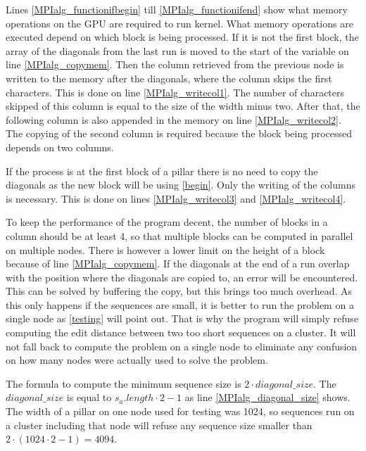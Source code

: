 Lines \ref{MPIalg_functionifbegin} till \ref{MPIalg_functionifend} show what memory operations on the GPU are required to run kernel.
What memory operations are executed depend on which block is being processed.
If it is not the first block, the array of the diagonals from the last run is moved to the start of the variable on line \ref{MPIalg_copymem}.
Then the column retrieved from the previous node is written to the memory after the diagonals, where the column skips the first characters.
This is done on line \ref{MPIalg_writecol1}.
The number of characters skipped of this column is equal to the size of the width minus two.
After that, the following column is also appended in the memory on line \ref{MPIalg_writecol2}.
The copying of the second column is required because the block being processed depends on two columns.

If the process is at the first block of a pillar there is no need to copy the diagonals as the new block will be using \cref{begin}.
Only the writing of the columns is necessary.
This is done on lines \ref{MPIalg_writecol3} and \ref{MPIalg_writecol4}.

To keep the performance of the program decent, the number of blocks in a column should be at least 4, so that multiple blocks can be computed in parallel on multiple nodes.
There is however a lower limit on the height of a block because of line \ref{MPIalg_copymem}.
If the diagonals at the end of a run overlap with the position where the diagonals are copied to, an error will be encountered.
This can be solved by buffering the copy, but this brings too much overhead.
As this only happens if the sequences are small, it is better to run the problem on a single node as \cref{testing} will point out.
That is why the program will simply refuse computing the edit distance between two too short sequences on a cluster.
It will not fall back to compute the problem on a single node to eliminate any confusion on how many nodes were actually used to solve the problem.

The formula to compute the minimum sequence size is $2 \cdot diagonal\_size$.
The $diagonal\_size$ is equal to $s_a.length \cdot 2 - 1$ as line \ref{MPIalg_diagonal_size} shows.
The width of a pillar on one node used for testing was 1024, so sequences run on a cluster including that node will refuse any sequence size smaller than $2 \cdot (1024 \cdot 2 - 1) = 4094$.
